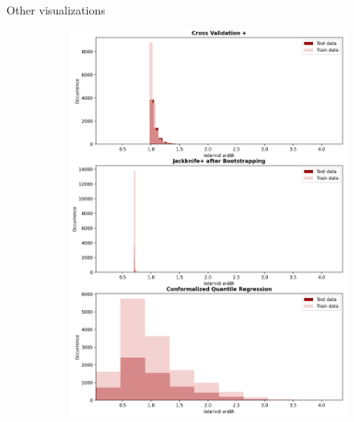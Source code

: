 \documentclass{beamer}
\begin{document}
\begin{frame}{Other visualizations}
    \begin{figure}[ht]
        \centering
        \begin{subfigure}[b]{0.32\textwidth}
            \centering
            \includegraphics[width=\textwidth, height=1.9\textwidth]{Figures/regression/width-occurrence-regression-problem.png}

\end{subfigure}
\end{figure}
\end{frame}
\end{document}

